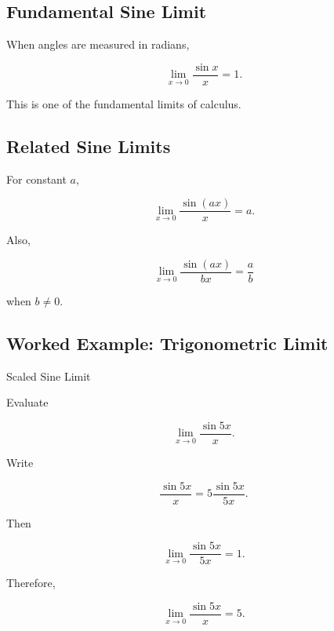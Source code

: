 \subsection{Fundamental Sine Limit}
\label{subsec:fundamental-sine-limit}

When angles are measured in radians,

\[
\boxed{
\lim_{x\to0}
\frac{\sin x}{x}
=
1.
}
\]

This is one of the fundamental limits of calculus.

\subsection{Related Sine Limits}
\label{subsec:related-sine-limits}

For constant \(a\),

\[
\boxed{
\lim_{x\to0}
\frac{\sin(ax)}{x}
=
a.
}
\]

Also,

\[
\boxed{
\lim_{x\to0}
\frac{\sin(ax)}{bx}
=
\frac{a}{b}
}
\]

when \(b\neq0\).

\subsection{Worked Example: Trigonometric Limit}
\label{subsec:worked-trigonometric-limit}

\begin{workedexamplebox}{Scaled Sine Limit}

Evaluate

\[
\lim_{x\to0}
\frac{\sin5x}{x}.
\]

Write

\[
\frac{\sin5x}{x}
=
5
\frac{\sin5x}{5x}.
\]

Then

\[
\lim_{x\to0}
\frac{\sin5x}{5x}
=
1.
\]

Therefore,

\begin{answerbox}
\[
\boxed{
\lim_{x\to0}
\frac{\sin5x}{x}
=
5.
}
\]
\end{answerbox}

\end{workedexamplebox}

